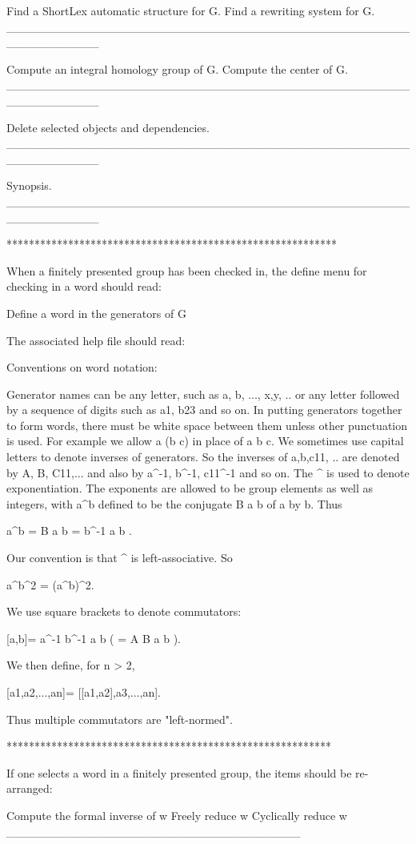 Find a ShortLex automatic structure for G.
Find a rewriting system for G.
___________________________________________________________

Compute an integral homology group of G.
Compute the center of G.
___________________________________________________________

Delete selected objects and dependencies.
___________________________________________________________

Synopsis.
___________________________________________________________

***********************************************************

When a finitely presented group has been checked in, the
define menu for checking in a word should read:

Define a word in the generators of G

The associated help file should read:

Conventions on word notation:

Generator names can be any letter, such as a, b, ...,
x,y, ..  or any letter followed by a sequence of digits
such as a1, b23 and so on. In putting generators together
to form words, there must be white space between them unless
other punctuation is used. For example we allow  a (b c) in 
place of a b c. We sometimes use capital letters to denote 
inverses of generators. So the inverses of a,b,c11, .. are 
denoted by A, B, C11,... and also by a^-1, b^-1, c11^-1 and 
so on. The ^ is used to denote exponentiation. The exponents
are allowed to be group elements as well as integers, with 
a^b defined to be the conjugate B a b of a by b. Thus

a^b = B a b  = b^-1 a b .

Our convention is that ^ is left-associative. So

a^b^2 = (a^b)^2.

We use square brackets to denote commutators:

[a,b]= a^-1 b^-1 a b ( = A B a b ).

We then define, for n > 2, 

[a1,a2,...,an]= [[a1,a2],a3,...,an].

Thus multiple commutators are "left-normed".

**********************************************************

If one selects a word in a finitely presented group, the items
should be re-arranged:

Compute the formal inverse of w
Freely reduce w
Cyclically reduce w
___________________________________

